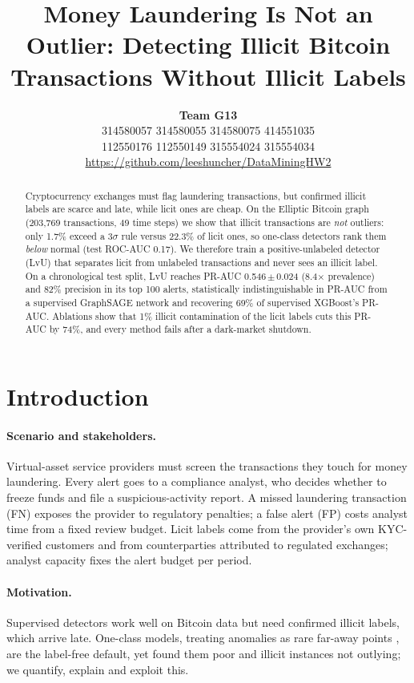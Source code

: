 \documentclass[11pt]{article}
\title{Money Laundering Is Not an Outlier: Detecting Illicit Bitcoin Transactions Without Illicit Labels}
\author{
  \textbf{Team G13} \\
  \zh{李尚哲} 314580057 \quad \zh{呂丞頤} 314580055 \quad \zh{黃駿甯} 314580075 \quad \zh{吳美真} 414551035 \\
  \zh{孫傅康} 112550176 \quad \zh{傅維雨} 112550149 \quad \zh{張凱華} 315554024 \quad \zh{李玠廷} 315554034 \\
  \url{https://github.com/leeshuncher/DataMiningHW2}
}
\newcommand{\ours}{LvU}
\begin{document}
\maketitle

\begin{abstract}
Cryptocurrency exchanges must flag laundering transactions, but confirmed illicit labels are scarce and late, while licit ones are cheap.
On the Elliptic Bitcoin graph (203,769 transactions, 49 time steps) we show that illicit transactions are \emph{not} outliers: only 1.7\% exceed a 3$\sigma$ rule versus 22.3\% of licit ones, so one-class detectors rank them \emph{below} normal (test ROC-AUC 0.17).
We therefore train a positive-unlabeled detector (\ours{}) that separates licit from unlabeled transactions and never sees an illicit label.
On a chronological test split, \ours{} reaches PR-AUC 0.546\,$\pm$\,0.024 (8.4$\times$ prevalence) and 82\% precision in its top 100 alerts, statistically indistinguishable in PR-AUC from a supervised GraphSAGE network and recovering 69\% of supervised XGBoost's PR-AUC.
Ablations show that 1\% illicit contamination of the licit labels cuts this PR-AUC by 74\%, and every method fails after a dark-market shutdown.
\end{abstract}

\section{Introduction}

\paragraph{Scenario and stakeholders.}
Virtual-asset service providers must screen the transactions they touch for money laundering.
Every alert goes to a compliance analyst, who decides whether to freeze funds and file a suspicious-activity report.
A missed laundering transaction (FN) exposes the provider to regulatory penalties; a false alert (FP) costs analyst time from a fixed review budget.
Licit labels come from the provider's own KYC-verified customers and from counterparties attributed to regulated exchanges; analyst capacity fixes the alert budget per period.

\paragraph{Motivation.}
Supervised detectors work well on Bitcoin data \citep{weber2019aml} but need confirmed illicit labels, which arrive late.
One-class models, treating anomalies as rare far-away points \citep{chandola2009survey}, are the label-free default, yet \citet{lorenz2020label} found them poor and illicit instances not outlying; we quantify, explain and exploit this.
\end{document}
